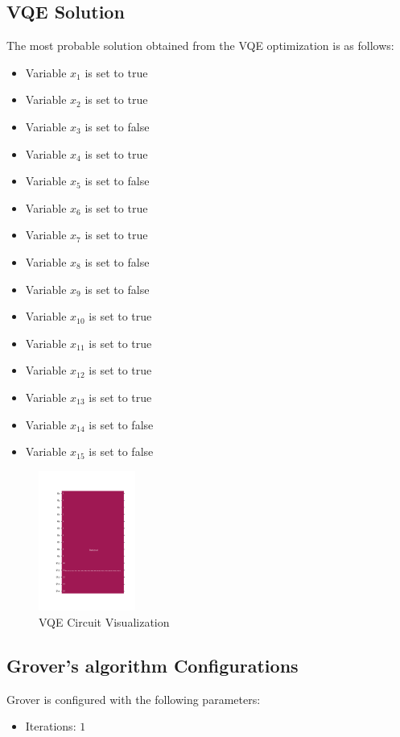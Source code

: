 \documentclass{article}%
\begin{document}
%
\subsection{VQE Solution}%
\label{subsec:VQESolution}%
The most probable solution obtained from the VQE optimization is as follows:\newline%
%
\begin{itemize}%
\item Variable \( x_1 \) is set to true%
\item Variable \( x_2 \) is set to true%
\item Variable \( x_3 \) is set to false%
\item Variable \( x_4 \) is set to true%
\item Variable \( x_5 \) is set to false%
\item Variable \( x_6 \) is set to true%
\item Variable \( x_7 \) is set to true%
\item Variable \( x_8 \) is set to false%
\item Variable \( x_9 \) is set to false%
\item Variable \( x_10 \) is set to true%
\item Variable \( x_11 \) is set to true%
\item Variable \( x_12 \) is set to true%
\item Variable \( x_13 \) is set to true%
\item Variable \( x_14 \) is set to false%
\item Variable \( x_15 \) is set to false%
\end{itemize}

%


\begin{figure}[h!]%
\centering%
\includegraphics[width=120px]{quantum_circuit_vqe.png}%
\caption{VQE Circuit Visualization}%
\end{figure}

%
\subsection{Grover's algorithm Configurations}%
\label{subsec:GroversalgorithmConfigurations}%
Grover is configured with the following parameters:\newline%
%
\begin{itemize}%
\item%
Iterations: \(1\)%
\end{itemize}
\end{document}
